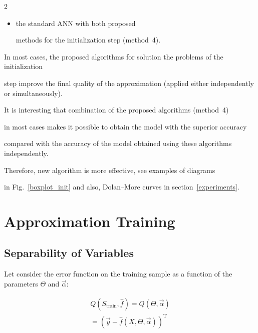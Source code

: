 \begin{multicols}{2}
\begin{itemize}
\item the standard ANN with both proposed

methods for the initialization step (method~4).

\end{itemize}





In most cases, the proposed algorithms for solution the problems of the initialization 

step improve the final quality of the approximation (applied either independently or simultaneously). 

It is interesting that combination of the proposed algorithms (method~4) 

in most cases makes it possible to obtain the model with the superior accuracy 

compared with the accuracy of the model obtained using these algorithms independently.

Therefore, new algorithm is more effective, see examples of diagrams 

in Fig.~\ref{boxplot_init} and also, Dolan--More curves in section~\ref{experiments}.



\section{Approximation Training}

\label{stage2}

 

\subsection{Separability of Variables}

\label{separability}



\noindent

Let consider the error function on the training sample as a function of the parameters $\Theta$ and $\vec \alpha$:

\begin{multline*}

  Q\left( S_{\mathrm{train}}, \hat f\right) =

  Q\left( \Theta, {\vec \alpha} \right)\\

  {}=   \left( \vec y - \hat f \left( X, \Theta, \vec\alpha \right) \right)^{\mathrm{T}}


\end{multline*}
\end{multicols}
